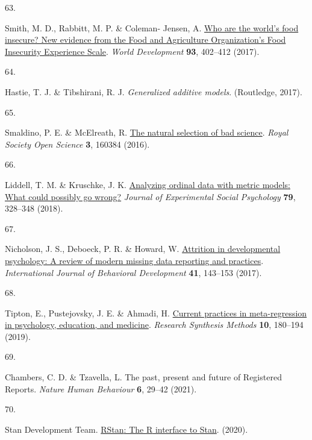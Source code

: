 \documentclass[
  man,floatsintext]{apa6}
\newlength{\cslhangindent}
\newlength{\csllabelwidth}
\newlength{\cslentryspacingunit} %
\newenvironment{CSLReferences}[2] %
 {%
  \setlength{\parindent}{0pt}
  \ifodd #1
  \let\oldpar\par
  \def\par{\hangindent=\cslhangindent\oldpar}
  \fi
  \setlength{\parskip}{#2\cslentryspacingunit}
 }%
 {}
\newcommand{\CSLLeftMargin}[1]{\parbox[t]{\csllabelwidth}{#1}}
\newcommand{\CSLRightInline}[1]{\parbox[t]{\linewidth - \csllabelwidth}{#1}\break}
\begin{document}
\begin{CSLReferences}{0}{0}
\leavevmode{}%
\CSLLeftMargin{63. }%
\CSLRightInline{Smith, M. D., Rabbitt, M. P. \& Coleman- Jensen, A. \href{https://doi.org/10.1016/j.worlddev.2017.01.006}{Who are the world's food insecure? New evidence from the {F}ood and {A}griculture {O}rganization's {F}ood {I}nsecurity {E}xperience {S}cale}. \emph{World Development} \textbf{93}, 402--412 (2017).}

\leavevmode{}%
\CSLLeftMargin{64. }%
\CSLRightInline{Hastie, T. J. \& Tibshirani, R. J. \emph{Generalized additive models}. (Routledge, 2017).}

\leavevmode{}%
\CSLLeftMargin{65. }%
\CSLRightInline{Smaldino, P. E. \& McElreath, R. \href{https://doi.org/10.1098/rsos.160384}{The natural selection of bad science}. \emph{Royal Society Open Science} \textbf{3}, 160384 (2016).}

\leavevmode{}%
\CSLLeftMargin{66. }%
\CSLRightInline{Liddell, T. M. \& Kruschke, J. K. \href{https://doi.org/10.1016/j.jesp.2018.08.009}{Analyzing ordinal data with metric models: What could possibly go wrong?} \emph{Journal of Experimental Social Psychology} \textbf{79}, 328--348 (2018).}

\leavevmode{}%
\CSLLeftMargin{67. }%
\CSLRightInline{Nicholson, J. S., Deboeck, P. R. \& Howard, W. \href{https://doi.org/10.1177/0165025415618275}{Attrition in developmental psychology: A review of modern missing data reporting and practices}. \emph{International Journal of Behavioral Development} \textbf{41}, 143--153 (2017).}

\leavevmode{}%
\CSLLeftMargin{68. }%
\CSLRightInline{Tipton, E., Pustejovsky, J. E. \& Ahmadi, H. \href{https://doi.org/10.1002/jrsm.1339}{Current practices in meta-regression in psychology, education, and medicine}. \emph{Research Synthesis Methods} \textbf{10}, 180--194 (2019).}

\leavevmode{}%
\CSLLeftMargin{69. }%
\CSLRightInline{Chambers, C. D. \& Tzavella, L. The past, present and future of {Registered Reports}. \emph{Nature Human Behaviour} \textbf{6}, 29--42 (2021).}

\leavevmode{}%
\CSLLeftMargin{70. }%
\CSLRightInline{Stan Development Team. \href{http://mc-stan.org/}{{RStan}: The {R} interface to {Stan}}. (2020).}


\end{CSLReferences}
\end{document}
